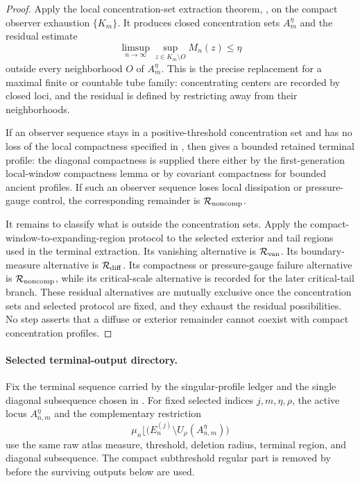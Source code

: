 \documentclass[11pt]{amsart}
\numberwithin{equation}{section}
\theoremstyle{plain}
\theoremstyle{definition}
\theoremstyle{remark}
\begin{document}
\begin{proof}
Apply the local concentration-set extraction theorem,
, on the compact observer exhaustion
\(\{K_m\}\).  It produces closed concentration sets \(A_m^\eta\) and the residual
estimate
\[
   \limsup_{n\to\infty}
   \sup_{z\in K_m\setminus O}M_n(z)\le\eta
\]
outside every neighborhood \(O\) of \(A_m^\eta\).  This is the precise
replacement for a maximal finite or countable tube family: concentrating centers are
recorded by closed loci, and the residual is defined by restricting away from
their neighborhoods.

If an observer sequence stays in a positive-threshold concentration set and has no
loss of the local compactness specified in , then
 gives a bounded retained terminal profile:
the diagonal compactness is supplied there either by the first-generation
local-window compactness lemma or by covariant compactness for bounded ancient profiles.  If such an observer
sequence loses local dissipation or pressure-gauge control, the corresponding
remainder is \(\mathcal R_{\rm noncomp}\).

It remains to classify what is outside the concentration sets.  Apply the
compact-window-to-expanding-region protocol
 to the selected exterior and
tail regions used in the terminal extraction.  Its vanishing alternative is
\(\mathcal R_{\rm van}\).  Its boundary-measure alternative is
\(\mathcal R_{\rm diff}\).  Its compactness or pressure-gauge failure
alternative is \(\mathcal R_{\rm noncomp}\), while its critical-scale
alternative is recorded for the later critical-tail branch.  These residual
alternatives are mutually exclusive once the concentration sets and selected protocol
are fixed, and they exhaust the residual possibilities.  No step asserts that a
diffuse or exterior remainder cannot coexist with compact concentration
profiles.
\end{proof}

\paragraph{Selected terminal-output directory.}
Fix the terminal sequence carried by the singular-profile ledger and the
single diagonal subsequence chosen in
.
For fixed selected indices \(j,m,\eta,\rho\), the active locus
\(A_{n,m}^{\eta}\) and the complementary restriction
\[
   \mu_n\lfloor
   \bigl(E_n^{(j)}\setminus U_\rho(A_{n,m}^{\eta})\bigr)
\]
use the same raw atlas measure, threshold, deletion radius, terminal region,
and diagonal subsequence.  The compact subthreshold regular part is removed by
 before the surviving outputs
below are used.
\end{document}
